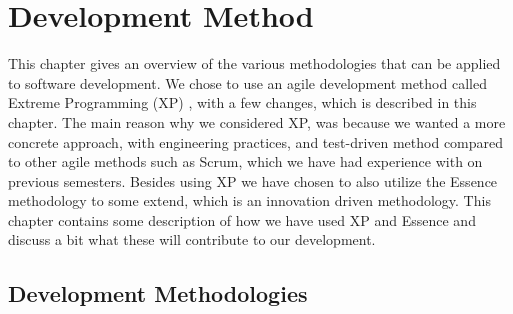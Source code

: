 
\chapter{Development Method}
\label{cha:development_method}

This chapter gives an overview of the various methodologies that can be applied to software development. We chose to use an agile development method called Extreme Programming (XP) \parencite{xp}, with a few changes, which is described in this chapter. The main reason why we considered XP, was because we wanted a more concrete approach, with engineering practices, and test-driven method compared to other agile methods such as Scrum, which we have had experience with on previous semesters. Besides using XP we have chosen to also utilize the Essence methodology \parencite{essence_book} to some extend, which is an innovation driven methodology. This chapter contains some description of how we have used XP and Essence and discuss a bit what these will contribute to our development.

\section{Development Methodologies}
\label{sec:development_methodologies}

